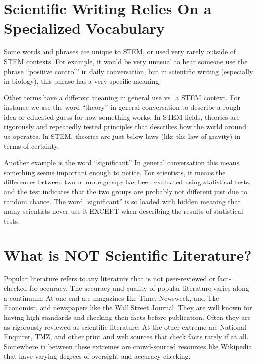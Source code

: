 \documentclass[
]{book}
\begin{document}
\hypertarget{scientific-writing-relies-on-a-specialized-vocabulary}{%
\section{Scientific Writing Relies On a Specialized Vocabulary}\label{scientific-writing-relies-on-a-specialized-vocabulary}}

Some words and phrases are unique to STEM, or used very rarely outside of STEM contexts. For example, it would be very unusual to hear someone use the phrase ``positive control'' in daily conversation, but in scientific writing (especially in biology), this phrase has a very specific meaning.

Other terms have a different meaning in general use vs.~a STEM context. For instance we use the word ``theory'' in general conversation to describe a rough idea or educated guess for how something works. In STEM fields, theories are rigorously and repeatedly tested principles that describes how the world around us operates. In STEM, theories are just below laws (like the law of gravity) in terms of certainty.

Another example is the word ``significant.'' In general conversation this means something seems important enough to notice. For scientists, it means the differences between two or more groups has been evaluated using statistical tests, and the test indicates that the two groups are probably not different just due to random chance. The word ``significant'' is so loaded with hidden meaning that many scientists never use it EXCEPT when describing the results of statistical tests.

\hypertarget{what-is-not-scientific-literature}{%
\section{What is NOT Scientific Literature?}\label{what-is-not-scientific-literature}}

Popular literature refers to any literature that is not peer-reviewed or fact-checked for accuracy. The accuracy and quality of popular literature varies along a continuum. At one end are magazines like Time, Newsweek, and The Economist, and newspapers like the Wall Street Journal. They are well known for having high standards and checking their facts before publication. Often they are as rigorously reviewed as scientific literature. At the other extreme are National Enquirer, TMZ, and other print and web sources that check facts rarely if at all. Somewhere in between these extremes are crowd-sourced resources like Wikipedia that have varying degrees of oversight and accuracy-checking.
\end{document}
